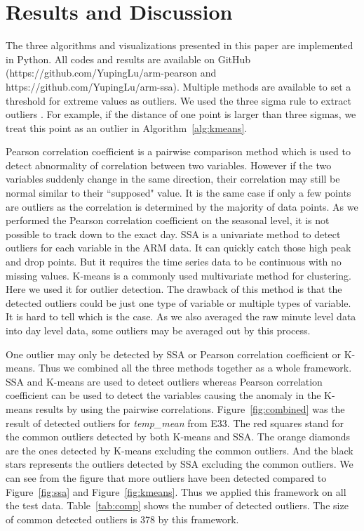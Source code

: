 \section{Results and Discussion}
The three algorithms and visualizations presented in this paper are 
implemented in Python. All codes and results are available on GitHub 
(https://github.com/YupingLu/arm-pearson and https://github.com/YupingLu/arm-ssa). 
Multiple methods are available to set a threshold for extreme values as 
outliers. We used the three sigma rule to extract outliers \cite{pukelsheim1994three}. 
For example, if the distance of one point is larger than three sigmas, 
we treat this point as an outlier in Algorithm~\ref{alg:kmeans}.

Pearson correlation coefficient is a pairwise comparison method which 
is used to detect abnormality of correlation between two variables. 
However if the two variables suddenly change in the same direction, 
their correlation may still be normal similar to their ``supposed" 
value. It is the same case if only a few points are outliers as the
correlation is determined by the majority of data points. 
As we performed the Pearson correlation 
coefficient on the seasonal level, it is not possible to track down 
to the exact day. SSA is a univariate method to detect outliers for 
each variable in the ARM data. It can quickly catch those high peak 
and drop points. But it requires the time series data to be continuous 
with no missing values. K-means is a commonly used multivariate method 
for clustering. Here we used it for outlier detection. The drawback of this method is 
that the detected outliers could be just one type of variable or 
multiple types of variable. It is hard to tell which is the case. 
As we also averaged the raw 
minute level data into day level data, some outliers may be averaged 
out by this process.

One outlier may only be detected by SSA or Pearson correlation coefficient 
or K-means. Thus we combined all the three methods together as a 
whole framework. SSA and K-means are used to detect outliers whereas Pearson 
correlation coefficient can be used to detect the variables causing the anomaly 
in the K-means results by using the pairwise correlations. Figure~\ref{fig:combined} was the result of 
detected outliers for \textit{temp\_mean} from E33. The red squares 
stand for the common outliers detected by both K-means and SSA. The 
orange diamonds are the ones detected by K-means excluding the common 
outliers. And the black stars represents the outliers detected by SSA 
excluding the common outliers. We can see from the figure that more 
outliers have been detected compared to Figure~\ref{fig:ssa} and Figure~\ref{fig:kmeans}. 
Thus we applied this framework on all the test data. Table~\ref{tab:comp} 
shows the number of detected outliers. The size of common detected 
outliers is 378 by this framework.

